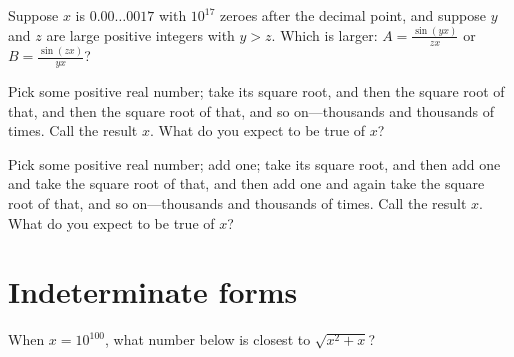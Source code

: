 \documentclass{ximera}
\begin{document}
\begin{problem}
  Suppose $x$ is $0.00\dots 0017$ with $10^{17}$ zeroes after the
  decimal point, and suppose $y$ and $z$ are large positive integers
  with $y > z$.  Which is larger: $A = \frac{\sin (yx)}{zx}$ or
  $B = \frac{\sin (zx)}{yx}$?
  \begin{multipleChoice}
  \end{multipleChoice}
\end{problem}

\begin{problem}
  Pick some positive real number; take its square root, and then the
  square root of that, and then the square root of that, and so
  on---thousands and thousands of times.  Call the result $x$.  What
  do you expect to be true of $x$?
  \begin{multipleChoice}
  \end{multipleChoice}
\end{problem}

\begin{problem}
  Pick some positive real number; add one; take its square root, and
  then add one and take the square root of that, and then add one and
  again take the square root of that, and so on---thousands and
  thousands of times.  Call the result $x$.  What do you expect to be
  true of $x$?
  \begin{multipleChoice}
  \end{multipleChoice}
\end{problem}



\clearpage

\section{Indeterminate forms}

\begin{problem}
  When $x = 10^{100}$, what number below is closest to $\sqrt{x^2 + x}$?
  \begin{multipleChoice}
  \end{multipleChoice}
\end{problem}
\end{document}
